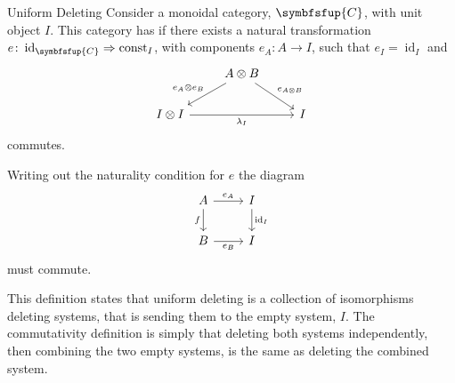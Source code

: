 \documentclass[fleqn]{NotesClass}
\newcommand{\cat}[1]{\symbfsfup{#1}}
\DeclareMathOperator{\id}{id}
\newcommand{\naturalTransformation}{\Rightarrow}
\newcommand{\const}{\mathrm{const}}
\begin{document}
    \begin{dfn}{Uniform Deleting}{}
        Consider a monoidal category, \(\cat{C}\), with unit object \(I\).
        This category has  if there exists a natural transformation \(e \colon \id_{\cat{C}} \naturalTransformation \const_I\), with components \(e_A \colon A \to I\), such that \(e_I = \id_I\) and
        \begin{equation}
            \begin{tikzcd}
                & A \otimes B \arrow[dl, "e_A \otimes e_B"'] \arrow[dr, "e_{A\otimes B}"] &\\
                I \otimes I \arrow[rr, "\lambda_I"'] && I
            \end{tikzcd}
        \end{equation}
        commutes.
    \end{dfn}
    
    Writing out the naturality condition for \(e\) the diagram
    \begin{equation}
        \begin{tikzcd}
            A \arrow[r, "e_A"] \arrow[d, "f"'] & I \arrow[d, "\id_I"]\\
            B \arrow[r, "e_B"'] & I
        \end{tikzcd}
    \end{equation}
    must commute.
    
    This definition states that uniform deleting is a collection of isomorphisms deleting systems, that is sending them to the empty system, \(I\).
    The commutativity definition is simply that deleting both systems independently, then combining the two empty systems, is the same as deleting the combined system.
    
\end{document}
